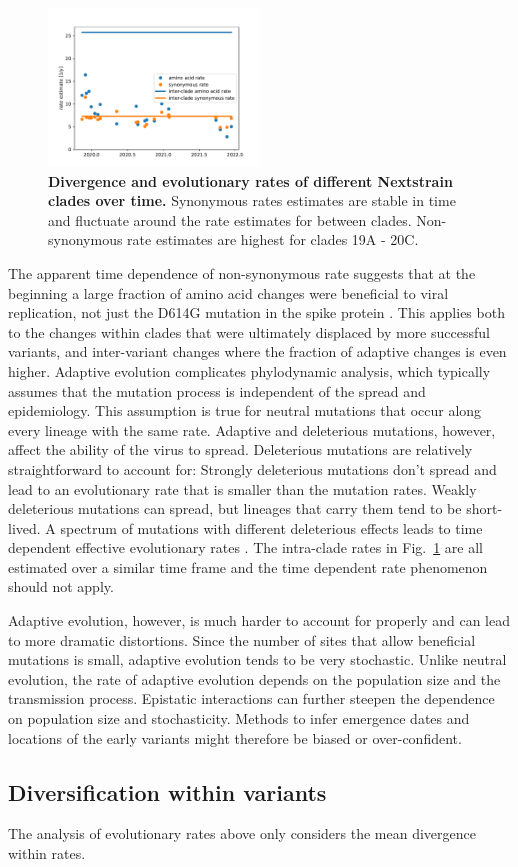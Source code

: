 \documentclass[aps,rmp, twocolumn]{revtex4}
\begin{document}
\begin{figure}
    \includegraphics[width=0.5\textwidth]{figures/rate_progression.pdf}
    \caption[]{{\bf Divergence and evolutionary rates of different Nextstrain clades over time.} Synonymous rates estimates are stable in time and fluctuate around the rate estimates for between clades. Non-synonymous rate estimates are highest for clades 19A - 20C.
    \label{fig:rate_progression} }
\end{figure}

The apparent time dependence of non-synonymous rate suggests that at the beginning a large fraction of amino acid changes were beneficial to viral replication, not just the D614G mutation in the spike protein \citep{korber_tracking_2020}.
This applies both to the changes within clades that were ultimately displaced by more successful variants, and inter-variant changes where the fraction of adaptive changes is even higher.
Adaptive evolution complicates phylodynamic analysis, which typically assumes that the mutation process is independent of the spread and epidemiology.
This assumption is true for neutral mutations that occur along every lineage with the same rate.
Adaptive and deleterious mutations, however, affect the ability of the virus to spread.
Deleterious mutations are relatively straightforward to account for: Strongly deleterious mutations don't spread and lead to an evolutionary rate that is smaller than the mutation rates.
Weakly deleterious mutations can spread, but lineages that carry them tend to be short-lived.
A spectrum of mutations with different deleterious effects leads to time dependent effective evolutionary rates \citep{wertheim_purifying_2011}.
The intra-clade rates in Fig.~\ref{fig:rate_progression} are all estimated over a similar time frame and the time dependent rate phenomenon should not apply.

Adaptive evolution, however, is much harder to account for properly and can lead to more dramatic distortions.
Since the number of sites that allow beneficial mutations is small, adaptive evolution tends to be very stochastic.
Unlike neutral evolution, the rate of adaptive evolution depends on the population size and the transmission process.
Epistatic interactions can further steepen the dependence on population size and stochasticity.
Methods to infer emergence dates and locations of the early variants might therefore be biased or over-confident.


\subsection*{Diversification within variants}
The analysis of evolutionary rates above only considers the mean divergence within rates.



\end{document}
